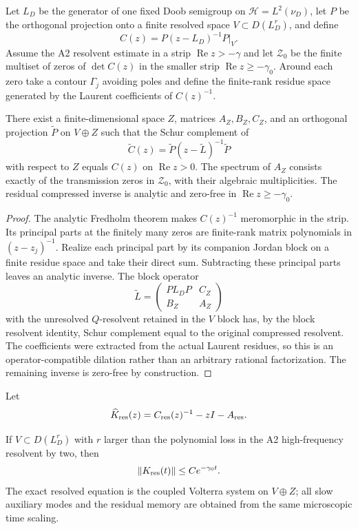 Let $L_D$ be the generator of one fixed Doob semigroup on
$\mathcal H=L^2(\nu_D)$, let $P$ be the orthogonal projection onto a finite
resolved space $V\subset D(L_D^r)$, and define
\[
 C(z)=P(z-L_D)^{-1}P|_V.
\]
Assume the A2 resolvent estimate in a strip
$\operatorname{Re}z>-\gamma$ and let $\mathcal Z_0$ be the finite multiset of
zeros of $\det C(z)$ in the smaller strip
$\operatorname{Re}z\ge-\gamma_0$.  Around each zero take a contour
$\Gamma_j$ avoiding poles and define the finite-rank residue space generated
by the Laurent coefficients of $C(z)^{-1}$.

\begin{theorem}
\label{thm:r7-a4-riesz}
There exist a finite-dimensional space $Z$, matrices $A_Z,B_Z,C_Z$, and an
orthogonal projection $\widetilde P$ on $V\oplus Z$ such that the Schur
complement of
\[
 \widetilde C(z)=
 \widetilde P(z-\widetilde L)^{-1}\widetilde P
\]
with respect to $Z$ equals $C(z)$ on
$\operatorname{Re}z>0$.  The spectrum of $A_Z$ consists exactly of the
transmission zeros in $\mathcal Z_0$, with their algebraic multiplicities.
The residual compressed inverse is analytic and zero-free in
$\operatorname{Re}z\ge-\gamma_0$.
\end{theorem}

\begin{proof}
The analytic Fredholm theorem makes $C(z)^{-1}$ meromorphic in the strip.
Its principal parts at the finitely many zeros are finite-rank matrix
polynomials in $(z-z_j)^{-1}$.  Realize each principal part by its companion
Jordan block on a finite residue space and take their direct sum.  Subtracting
these principal parts leaves an analytic inverse.  The block operator
\[
 \widetilde L=
 \begin{pmatrix}PL_DP& C_Z\\ B_Z&A_Z\end{pmatrix}
\]
with the unresolved $Q$-resolvent retained in the $V$ block has, by the block
resolvent identity, Schur complement equal to the original compressed
resolvent.  The coefficients were extracted from the actual Laurent residues,
so this is an operator-compatible dilation rather than an arbitrary rational
factorization.  The remaining inverse is zero-free by construction.
\end{proof}

Let
\[
 \widehat K_{\rm res}(z)
 =C_{\rm res}(z)^{-1}-zI-A_{\rm res}.
\]

\begin{theorem}
\label{thm:r7-a4-memory}
If $V\subset D(L_D^r)$ with
$r$ larger than the polynomial loss in the A2 high-frequency resolvent by two,
then
\[
 \|K_{\rm res}(t)\|\le Ce^{-\gamma_0t}.
\]
The exact resolved equation is the coupled Volterra system on $V\oplus Z$;
all slow auxiliary modes and the residual memory are obtained from the same
microscopic time scaling.
\end{theorem}

